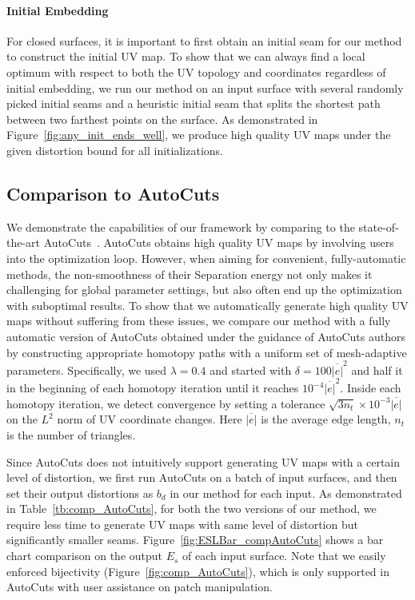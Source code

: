 \paragraph{Initial Embedding}
\minchen{[TODO?]}
For closed surfaces, it is important to first obtain an initial seam for our method to construct the initial UV map. To show that we can always find a local optimum with respect to both the UV topology and coordinates regardless of initial embedding, we run our method on an input surface with several randomly picked initial seams and a heuristic initial seam that splits the shortest path between two farthest points on the surface. As demonstrated in Figure~\ref{fig:any_init_ends_well}, we produce high quality UV maps under the given distortion bound for all initializations.


\subsection{Comparison to AutoCuts}

We demonstrate the capabilities of our framework by comparing to the state-of-the-art AutoCuts~\cite{Poranne2017Autocuts}.
AutoCuts obtains high quality UV maps by involving users into the optimization loop. However, when aiming for convenient, fully-automatic methods, the non-smoothness of their Separation energy not only makes it challenging for global parameter settings, but also often end up the optimization with suboptimal results. To show that we automatically generate high quality UV maps without suffering from these issues, we compare our method with a fully automatic version of AutoCuts obtained under the guidance of AutoCuts authors by constructing appropriate homotopy paths with a uniform set of mesh-adaptive parameters. 
Specifically, we used $\lambda = 0.4$ and started with $\delta=100\overline{|e|}^2$ and half it in the beginning of each homotopy iteration until it reaches $10^{-4}\overline{|e|}^2$. Inside each homotopy iteration, we detect convergence by setting a tolerance $\sqrt{3n_t}\times10^{-3}\overline{|e|}$ on the $L^2$ norm of UV coordinate changes. Here $\overline{|e|}$ is the average edge length, $n_t$ is the number of triangles.

Since AutoCuts does not intuitively support generating UV maps with a certain level of distortion, we first run AutoCuts on a batch of input surfaces, and then set their output distortions as $b_d$ in our method for each input. As demonstrated in Table~\ref{tb:comp_AutoCuts}, for both the two versions of our method, we require less time to generate UV maps with same level of distortion but significantly smaller seams. Figure~\ref{fig:ESLBar_compAutoCuts} shows a bar chart comparison on the output $E_{s}$ of each input surface. Note that we easily enforced bijectivity (Figure~\ref{fig:comp_AutoCuts}), which is only supported in AutoCuts with user assistance on patch manipulation.

